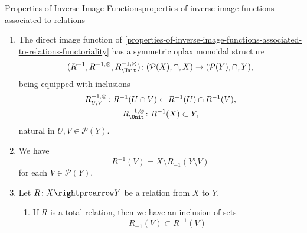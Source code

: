 \begin{proposition}{Properties of Inverse Image Functions}{properties-of-inverse-image-functions-associated-to-relations}
\begin{enumerate}
\[\begin{gathered}
                    R^{-1,\otimes}_{U,V}   \colon R^{-1}(U)\cup R^{-1}(V) \rightequalsarrow R^{-1}(U\cup V),\\
                    R^{-1,\otimes}_{\Unit} \colon \emptyset               \rightequalsarrow \emptyset,
                \end{gathered}
            \]%
            natural in $U,V\in\mathcal{P}(Y)$.
        \item\label{properties-of-inverse-image-functions-associated-to-relations-symmetric-oplax-monoidality-with-respect-to-intersections}The direct image function of \cref{properties-of-inverse-image-functions-associated-to-relations-functoriality} has a symmetric oplax monoidal structure
            \[
                (R^{-1},R^{-1,\otimes},R^{-1,\otimes}_{\Unit})
                \colon
                (\mathcal{P}(X),\cap,X)
                \to
                (\mathcal{P}(Y),\cap,Y),
            \]%
            being equipped with inclusions%
            \[
                \begin{gathered}
                    R^{-1,\otimes}_{U,V}   \colon R^{-1}(U\cap V) \subset R^{-1}(U)\cap R^{-1}(V),\\
                    R^{-1,\otimes}_{\Unit} \colon R^{-1}(X)       \subset Y,
                \end{gathered}
            \]%
            natural in $U,V\in\mathcal{P}(Y)$.
        \item\label{properties-of-inverse-image-functions-associated-to-relations-interaction-with-coinverse-images-1}We have
            \[
                R^{-1}(V)%
                =%
                X\setminus R_{-1}(Y\setminus V)
            \]%
            for each $V\in\mathcal{P}(Y)$.
        \item\label{properties-of-inverse-image-functions-associated-to-relations-interaction-with-coinverse-images-2}Let $R\colon X\rightproarrow Y$ be a relation from $X$ to $Y$.
            \begin{enumerate}
                \item\label{properties-of-inverse-image-functions-associated-to-relations-interaction-with-coinverse-images-2-a}If $R$ is a total relation, then we have an inclusion of sets
                    \[
                        R_{-1}(V)
                        \subset
                        R^{-1}(V)
                    \]%

\end{enumerate}
\end{enumerate}
\end{proposition}

